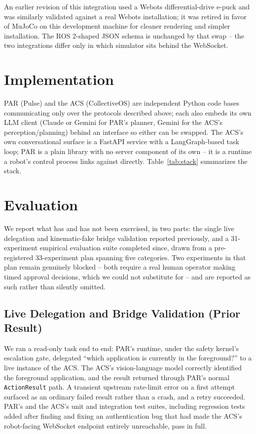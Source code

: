 \documentclass[conference]{IEEEtran}
\begin{document}
An earlier revision of this integration used a Webots \cite{michel2004webots} differential-drive e-puck
and was similarly validated against a real Webots installation; it was retired in favor of MuJoCo on this
development machine for cleaner rendering and simpler installation. The ROS 2-shaped JSON schema is
unchanged by that swap -- the two integrations differ only in which simulator sits behind the WebSocket.

\section{Implementation}
PAR (Pulse) and the ACS (CollectiveOS) are independent Python code bases communicating only over
the protocols described above; each also embeds its own LLM client (Claude or Gemini for PAR's planner,
Gemini for the ACS's perception/planning) behind an interface so either can be swapped. The ACS's own
conversational surface is a FastAPI service with a LangGraph-based task loop; PAR is a plain library with
no server component of its own -- it is a runtime a robot's control process links against directly. Table~\ref{tab:stack}
summarizes the stack.

\section{Evaluation}
\label{sec:evaluation}
We report what has and has not been exercised, in two parts: the single live delegation and kinematic-fake
bridge validation reported previously, and a 31-experiment empirical evaluation suite completed since, drawn
from a pre-registered 33-experiment plan spanning five categories. Two experiments in that plan remain
genuinely blocked -- both require a real human operator making timed approval decisions, which we could
not substitute for -- and are reported as such rather than silently omitted.

\subsection{Live Delegation and Bridge Validation (Prior Result)}
We ran a read-only task end to end: PAR's runtime, under the safety kernel's escalation gate, delegated
``which application is currently in the foreground?'' to a live instance of the ACS. The ACS's vision-language
model correctly identified the foreground application, and the result returned through PAR's normal
\texttt{ActionResult} path. A transient upstream rate-limit error on a first attempt surfaced as an ordinary failed
result rather than a crash, and a retry succeeded. PAR's and the ACS's unit and integration test suites,
including regression tests added after finding and fixing an authentication bug that had made the ACS's
robot-facing WebSocket endpoint entirely unreachable, pass in full.
\end{document}

